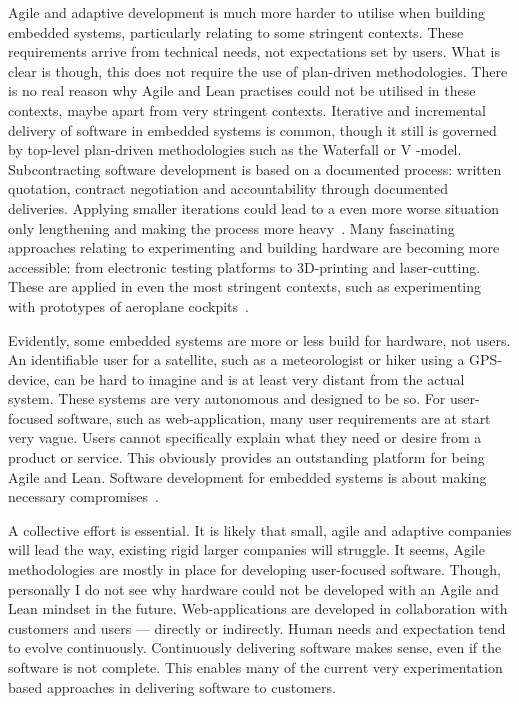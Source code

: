 \documentclass[english]{tktltiki2}
\begin{document}
Agile and adaptive development is much more harder to utilise when building embedded systems, particularly relating to some stringent contexts. These requirements arrive from technical needs, not expectations set by users. What is clear is though, this does not require the use of plan-driven methodologies. There is no real reason why Agile and Lean practises could not be utilised in these contexts, maybe apart from very stringent contexts. Iterative and incremental delivery of software in embedded systems is common, though it still is governed by top-level plan-driven methodologies such as the Waterfall or V -model. Subcontracting software development is based on a documented process: written quotation, contract negotiation and accountability through documented deliveries. Applying smaller iterations could lead to a even more worse situation only lengthening and making the process more heavy~\cite{Hol15b}. Many fascinating approaches relating to experimenting and building hardware are becoming more accessible: from electronic testing platforms to 3D-printing and laser-cutting. These are applied in even the most stringent contexts, such as experimenting with prototypes of aeroplane cockpits~\cite{Air15}.

Evidently, some embedded systems are more or less build for hardware, not users. An identifiable user for a satellite, such as a meteorologist or hiker using a GPS-device, can be hard to imagine and is at least very distant from the actual system. These systems are very autonomous and designed to be so. For user-focused software, such as web-application, many user requirements are at start very vague. Users cannot specifically explain what they need or desire from a product or service. This obviously provides an outstanding platform for being Agile and Lean. Software development for embedded systems is about making necessary compromises~\cite{BT15}.

A collective effort is essential. It is likely that small, agile and adaptive companies will lead the way, existing rigid larger companies will struggle. It seems, Agile methodologies are mostly in place for developing user-focused software. Though, personally I do not see why hardware could not be developed with an Agile and Lean mindset in the future. Web-applications are developed in collaboration with customers and users — directly or indirectly. Human needs and expectation tend to evolve continuously. Continuously delivering software makes sense, even if the software is not complete. This enables many of the current very experimentation based approaches in delivering software to customers.
\end{document}

